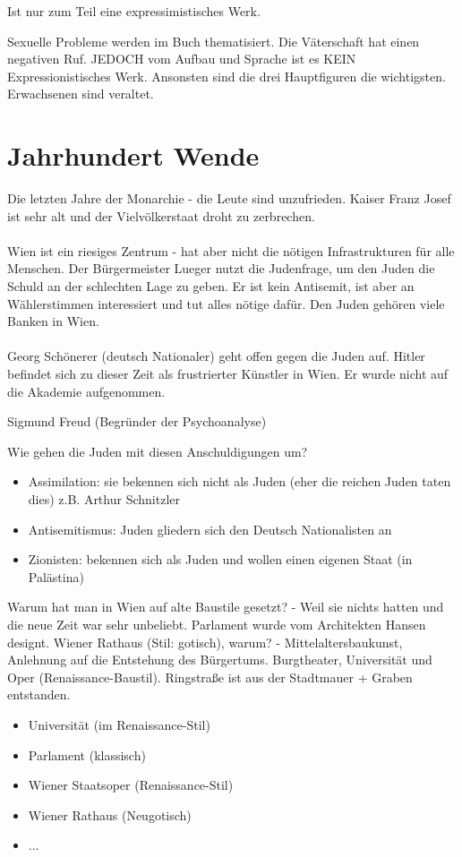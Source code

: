 \documentclass[12pt,a4paper]{article}
\begin{document}
Ist nur zum Teil eine expressimistisches Werk.

Sexuelle Probleme werden im Buch thematisiert.
Die Väterschaft hat einen negativen Ruf.
JEDOCH vom Aufbau und Sprache ist es KEIN Expressionistisches Werk.
Ansonsten sind die drei Hauptfiguren die wichtigsten. Erwachsenen sind veraltet.

\section{Jahrhundert Wende}

Die letzten Jahre der Monarchie - die Leute sind unzufrieden. Kaiser Franz Josef ist sehr alt und der Vielvölkerstaat droht zu zerbrechen.\\\\
Wien ist ein riesiges Zentrum - hat aber nicht die nötigen Infrastrukturen für alle Menschen. Der Bürgermeister Lueger nutzt die Judenfrage, um den Juden die Schuld an der schlechten Lage zu geben. Er ist kein Antisemit, ist aber an Wählerstimmen interessiert und tut alles nötige dafür. Den Juden gehören viele Banken in Wien.\\\\
Georg Schönerer (deutsch Nationaler) geht offen gegen die Juden auf. Hitler befindet sich zu dieser Zeit als frustrierter Künstler in Wien. Er wurde nicht auf die Akademie aufgenommen.

Sigmund Freud (Begründer der Psychoanalyse)

Wie gehen die Juden mit diesen Anschuldigungen um?

\begin{itemize}
\item Assimilation: sie bekennen sich nicht als Juden (eher die reichen Juden taten dies) z.B. Arthur Schnitzler
\item Antisemitismus: Juden gliedern sich den Deutsch Nationalisten an
\item Zionisten: bekennen sich als Juden und wollen einen eigenen Staat (in Palästina)
\end{itemize}
Warum hat man in Wien auf alte Baustile gesetzt? - Weil sie nichts hatten und die neue Zeit war sehr unbeliebt. Parlament wurde vom Architekten Hansen designt. Wiener Rathaus (Stil: gotisch), warum? - Mittelaltersbaukunst, Anlehnung auf die Entstehung des Bürgertums. Burgtheater, Universität und Oper (Renaissance-Baustil). Ringstraße ist aus der Stadtmauer + Graben entstanden.

\begin{itemize}
\item Universität (im Renaissance-Stil)
\item Parlament (klassisch)
\item Wiener Staatsoper (Renaissance-Stil)
\item Wiener Rathaus (Neugotisch)
\item ...
\end{itemize}
\end{document}
